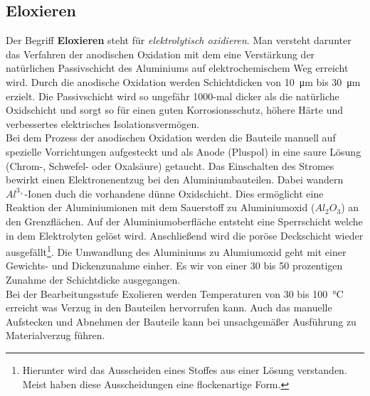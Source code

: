 \documentclass[12pt,a4paper,parskip,twoside,BCOR5mm,headsepline]{scrartcl}
\begin{document}
\begin{description*}
\subsection{Eloxieren}
Der Begriff \textbf{Eloxieren} steht für \textsl{elektrolytisch oxidieren}. Man versteht darunter das Verfahren der anodischen Oxidation mit dem eine Verstärkung der natürlichen Passivschicht des Aluminiums auf elektrochemischem Weg erreicht wird. Durch die anodische Oxidation werden Schichtdicken von \SI{10}{\micro\meter} bis \SI{30}{\micro\meter} erzielt. Die Passivschicht wird so ungefähr 1000-mal dicker als die natürliche Oxidschicht und sorgt so für einen guten Korrosionsschutz, höhere Härte und verbessertes elektrisches  Isolationsvermögen.\\
 Bei dem Prozess der anodischen Oxidation werden die Bauteile manuell auf spezielle Vorrichtungen aufgesteckt und als Anode (Pluspol) in eine saure Lösung (Chrom-, Schwefel- oder Oxalsäure) getaucht. Das Einschalten des Stromes bewirkt einen Elektronenentzug bei den Aluminiumbauteilen. Dabei wandern $Al^{3_+}$-Ionen duch die vorhandene dünne Oxidschicht. Dies ermöglicht eine Reaktion der Aluminiumionen mit dem Sauerstoff zu Aluminiumoxid ($Al_2O_3$) an den Grenzflächen. Auf der Aluminiumoberfläche entsteht eine Sperrschicht welche in dem Elektrolyten gelöst wird. Anschließend wird die poröse Deckschicht wieder ausgefällt\footnote{Hierunter wird das Ausscheiden eines Stoffes aus einer Lösung verstanden. Meist haben diese Ausscheidungen eine flockenartige Form.}.
Die Umwandlung des Aluminiums zu Alumiumoxid geht mit einer Gewichts- und Dickenzunahme einher. Es wir von einer 30 bis 50 prozentigen Zunahme der Schichtdicke ausgegangen. \autocite[127-128]{wm}\\
Bei der Bearbeitungsstufe Exolieren werden Temperaturen von 30 bis \SI{100}{\degreeCelsius} erreicht was Verzug in den Bauteilen hervorrufen kann. Auch das manuelle Aufstecken und Abnehmen der Bauteile kann bei unsachgemäßer Ausführung zu Materialverzug führen.


\end{description*}
\end{document}
